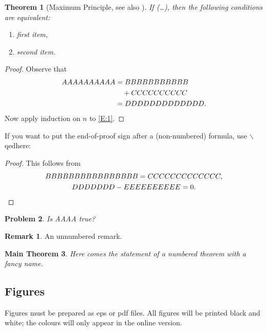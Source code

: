 \documentclass[12pt, twoside]{article}
\newtheorem{thm}{Theorem}[section]
\newtheorem{prob}[thm]{Problem}
\newtheorem{mainthm}[thm]{Main Theorem}
\theoremstyle{definition}
\newtheorem*{xrem}{Remark}
\numberwithin{equation}{section}
\begin{document}
\begin{thm}[Maximum Principle, see also {\cite[Theorem 5]{Shchepin}}]
If (\ldots), then the following conditions are equivalent: 

\begin{enumerate}[\upshape (i)]
\item first item,
\item second item.
\end{enumerate}
\end{thm}

\begin{proof} Observe that
\begin{align}\label{E:1}
AAAAAAAAAA &= BBBBBBBBBBB\notag\\
           &\quad + CCCCCCCCCC\notag\\
           &= DDDDDDDDDDDDD.
\end{align}
Now apply induction on $n$ to \eqref{E:1}.
\end{proof}


If you want to put the end-of-proof sign after a (non-numbered) formula, use $\backslash$qedhere:

\begin{proof} This follows from
\begin{gather*}
BBBBBBBBBBBBBBBB=CCCCCCCCCCCCC,\\
DDDDDDD-EEEEEEEEEE=0.\qedhere
\end{gather*}
\end{proof}



\begin{prob}
Is AAAA true?
\end{prob}




\begin{xrem}
An unnumbered remark.
\end{xrem}


\begin{mainthm} 
Here comes the statement of a numbered theorem with a fancy name.
\end{mainthm}


\subsection{Figures}
Figures must be prepared as eps or pdf files.
All figures will be printed black and white; the colours will only appear in the online version.
\end{document}
